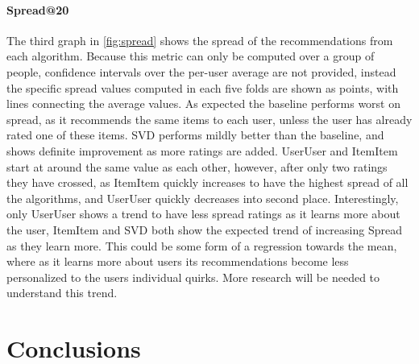 \documentclass[letterpaper]{sig-alternate}
\begin{document}
  \paragraph{Spread@20}
  The third graph in \ref{fig:spread} shows the spread of the recommendations from each algorithm.
  Because this metric can only be computed over a group of people, confidence intervals over the per-user average are not provided, instead the specific spread values computed in each five folds are shown as points, with lines connecting the average values.
  As expected the baseline performs worst on spread, as it recommends the same items to each user, unless the user has already rated one of these items.
  SVD performs mildly better than the baseline, and shows definite improvement as more ratings are added.
  UserUser and ItemItem start at around the same value as each other, however, after only two ratings they have crossed, as ItemItem quickly increases to have the highest spread of all the algorithms, and UserUser quickly decreases into second place.
  Interestingly, only UserUser shows a trend to have less spread ratings as it learns more about the user, ItemItem and SVD both show the expected trend of increasing Spread as they learn more.
  This could be some form of a regression towards the mean, where as it learns more about users its recommendations become less personalized to the users individual quirks.
  More research will be needed to understand this trend.
  
\section{Conclusions}

    
\end{document}
